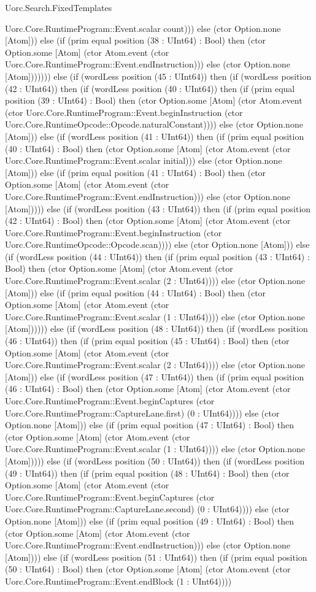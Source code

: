 \begin{lexlean}{Uorc.Search.FixedTemplates}
\begin{semanticmodule}
{Uorc.Core.RuntimeProgram::Event.scalar count))) else (ctor Option.none [Atom])) else (if (prim equal position (38 : UInt64) : Bool) then (ctor Option.some [Atom] (ctor Atom.event (ctor Uorc.Core.RuntimeProgram::Event.endInstruction))) else (ctor Option.none [Atom])))))) else (if (wordLess position (45 : UInt64)) then (if (wordLess position (42 : UInt64)) then (if (wordLess position (40 : UInt64)) then (if (prim equal position (39 : UInt64) : Bool) then (ctor Option.some [Atom] (ctor Atom.event (ctor Uorc.Core.RuntimeProgram::Event.beginInstruction (ctor Uorc.Core.RuntimeOpcode::Opcode.naturalConstant)))) else (ctor Option.none [Atom])) else (if (wordLess position (41 : UInt64)) then (if (prim equal position (40 : UInt64) : Bool) then (ctor Option.some [Atom] (ctor Atom.event (ctor Uorc.Core.RuntimeProgram::Event.scalar initial))) else (ctor Option.none [Atom])) else (if (prim equal position (41 : UInt64) : Bool) then (ctor Option.some [Atom] (ctor Atom.event (ctor Uorc.Core.RuntimeProgram::Event.endInstruction))) else (ctor Option.none [Atom])))) else (if (wordLess position (43 : UInt64)) then (if (prim equal position (42 : UInt64) : Bool) then (ctor Option.some [Atom] (ctor Atom.event (ctor Uorc.Core.RuntimeProgram::Event.beginInstruction (ctor Uorc.Core.RuntimeOpcode::Opcode.scan)))) else (ctor Option.none [Atom])) else (if (wordLess position (44 : UInt64)) then (if (prim equal position (43 : UInt64) : Bool) then (ctor Option.some [Atom] (ctor Atom.event (ctor Uorc.Core.RuntimeProgram::Event.scalar (2 : UInt64)))) else (ctor Option.none [Atom])) else (if (prim equal position (44 : UInt64) : Bool) then (ctor Option.some [Atom] (ctor Atom.event (ctor Uorc.Core.RuntimeProgram::Event.scalar (1 : UInt64)))) else (ctor Option.none [Atom]))))) else (if (wordLess position (48 : UInt64)) then (if (wordLess position (46 : UInt64)) then (if (prim equal position (45 : UInt64) : Bool) then (ctor Option.some [Atom] (ctor Atom.event (ctor Uorc.Core.RuntimeProgram::Event.scalar (2 : UInt64)))) else (ctor Option.none [Atom])) else (if (wordLess position (47 : UInt64)) then (if (prim equal position (46 : UInt64) : Bool) then (ctor Option.some [Atom] (ctor Atom.event (ctor Uorc.Core.RuntimeProgram::Event.beginCaptures (ctor Uorc.Core.RuntimeProgram::CaptureLane.first) (0 : UInt64)))) else (ctor Option.none [Atom])) else (if (prim equal position (47 : UInt64) : Bool) then (ctor Option.some [Atom] (ctor Atom.event (ctor Uorc.Core.RuntimeProgram::Event.scalar (1 : UInt64)))) else (ctor Option.none [Atom])))) else (if (wordLess position (50 : UInt64)) then (if (wordLess position (49 : UInt64)) then (if (prim equal position (48 : UInt64) : Bool) then (ctor Option.some [Atom] (ctor Atom.event (ctor Uorc.Core.RuntimeProgram::Event.beginCaptures (ctor Uorc.Core.RuntimeProgram::CaptureLane.second) (0 : UInt64)))) else (ctor Option.none [Atom])) else (if (prim equal position (49 : UInt64) : Bool) then (ctor Option.some [Atom] (ctor Atom.event (ctor Uorc.Core.RuntimeProgram::Event.endInstruction))) else (ctor Option.none [Atom]))) else (if (wordLess position (51 : UInt64)) then (if (prim equal position (50 : UInt64) : Bool) then (ctor Option.some [Atom] (ctor Atom.event (ctor Uorc.Core.RuntimeProgram::Event.endBlock (1 : UInt64)))) }
\end{semanticmodule}
\end{lexlean}
